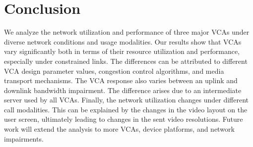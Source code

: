 \section{Conclusion}
\label{sec:conclusion}
We analyze the network utilization and performance of three major VCAs under diverse network conditions and usage modalities. Our results show that VCAs vary significantly both in terms of their resource utilization and performance, especially under constrained links. The differences can be attributed to different VCA design parameter values, congestion control algorithms, and media transport mechanisms. The VCA response also varies between an uplink and downlink bandwidth impairment. The difference arises due to an intermediate server used by all VCAs. Finally, the network utilization changes under different call modalities. This can be explained by the changes in the video layout on the user screen, ultimately leading to changes in the sent video resolutions. Future work will extend the analysis to more VCAs, device platforms, and network impairments. 
